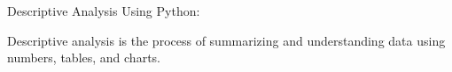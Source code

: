 Descriptive Analysis Using Python:

    Descriptive analysis is the process of summarizing and understanding data using numbers, tables, and charts.
